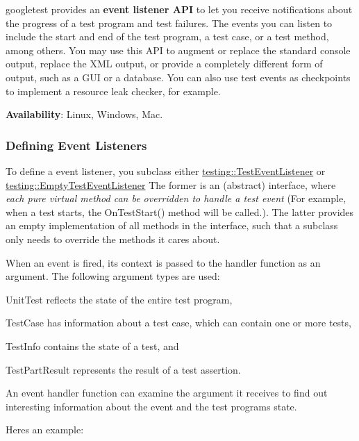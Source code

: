 googletest provides an {\bfseries event listener A\+PI} to let you receive notifications about the progress of a test program and test failures. The events you can listen to include the start and end of the test program, a test case, or a test method, among others. You may use this A\+PI to augment or replace the standard console output, replace the X\+ML output, or provide a completely different form of output, such as a G\+UI or a database. You can also use test events as checkpoints to implement a resource leak checker, for example.

{\bfseries Availability}\+: Linux, Windows, Mac.

\subsubsection*{Defining Event Listeners}

To define a event listener, you subclass either \mbox{\hyperlink{classtesting_1_1_test_event_listener}{testing\+::\+Test\+Event\+Listener}} or \mbox{\hyperlink{classtesting_1_1_empty_test_event_listener}{testing\+::\+Empty\+Test\+Event\+Listener}} The former is an (abstract) interface, where {\itshape each pure virtual method can be overridden to handle a test event} (For example, when a test starts, the {\ttfamily On\+Test\+Start()} method will be called.). The latter provides an empty implementation of all methods in the interface, such that a subclass only needs to override the methods it cares about.

When an event is fired, its context is passed to the handler function as an argument. The following argument types are used\+:


\begin{DoxyItemize}
\item Unit\+Test reflects the state of the entire test program,
\item Test\+Case has information about a test case, which can contain one or more tests,
\item Test\+Info contains the state of a test, and
\item Test\+Part\+Result represents the result of a test assertion.
\end{DoxyItemize}

An event handler function can examine the argument it receives to find out interesting information about the event and the test program\textquotesingle{}s state.

Here\textquotesingle{}s an example\+:


